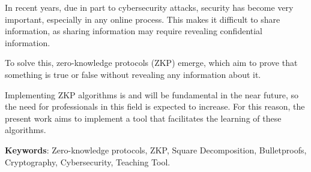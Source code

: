 In recent years, due in part to cybersecurity attacks, security has become very important, especially in any online process. This makes it difficult to share information, as sharing information may require revealing confidential information.

To solve this, zero-knowledge protocols (ZKP) emerge, which aim to prove that something is true or false without revealing any information about it.

Implementing ZKP algorithms is and will be fundamental in the near future, so the need for professionals in this field is expected to increase. For this reason, the present work aims to implement a tool that facilitates the learning of these algorithms.

\vfill

\textbf{Keywords}: Zero-knowledge protocols, ZKP, Square Decomposition, Bulletproofs, Cryptography, Cybersecurity, Teaching Tool.

\blankpage